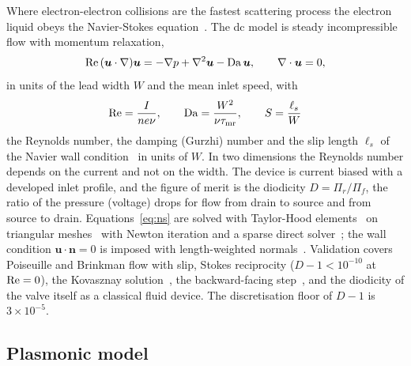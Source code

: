 Where electron-electron collisions are the fastest scattering process the
electron liquid obeys the Navier-Stokes
equation~\cite{gurzhi1968hydrodynamic,bandurin2016negative}. The dc model is
steady incompressible flow with momentum relaxation,
\begin{equation}
\mathrm{Re}\,(\bm{u}\cdot\nabla)\bm{u}=-\nabla p+\nabla^{2}\bm{u}-\mathrm{Da}\,\bm{u},
\qquad \nabla\cdot\bm{u}=0,
\label{eq:ns}
\end{equation}
in units of the lead width $W$ and the mean inlet speed, with
\begin{equation}
\mathrm{Re}=\frac{I}{n e \nu},\qquad \mathrm{Da}=\frac{W^{2}}{\nu\tau_{\mathrm{mr}}},\qquad
S=\frac{\ell_{s}}{W}
\end{equation}
the Reynolds number, the damping (Gurzhi) number and the slip length
$\ell_{s}$ of the Navier wall condition~\cite{kiselev2019boundary} in units
of $W$. In two dimensions the Reynolds number depends on the current and not
on the width. The device is current biased with a developed inlet profile,
and the figure of merit is the diodicity $D=\Pi_{r}/\Pi_{f}$, the ratio of
the pressure (voltage) drops for flow from drain to source and from source
to drain. Equations~\eqref{eq:ns} are solved with Taylor-Hood
elements~\cite{taylor1973numerical} on triangular
meshes~\cite{geuzaine2009gmsh} with Newton iteration and a sparse direct
solver~\cite{guennebaud2010eigen}; the wall condition
$\bm{u}\cdot\bm{n}=0$ is imposed with length-weighted
normals~\cite{engelman1982implementation}. Validation covers Poiseuille and Brinkman flow with
slip, Stokes reciprocity ($D-1<10^{-10}$ at $\mathrm{Re}=0$), the Kovasznay
solution~\cite{kovasznay1948laminar}, the backward-facing
step~\cite{armaly1983experimental,erturk2008numerical}, and the
diodicity of the valve itself as a classical fluid device. The discretisation
floor of $D-1$ is $3\times10^{-5}$.

\subsection{Plasmonic model}
\label{sec:model-plasmonic}

